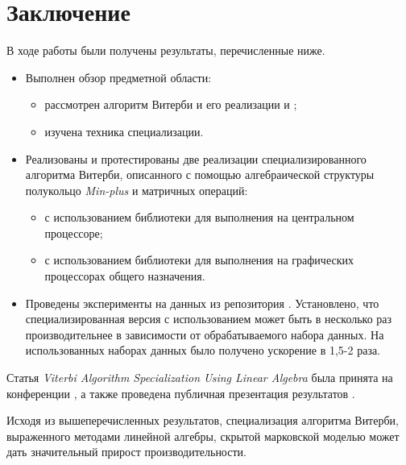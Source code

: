 \section{Заключение}
В ходе работы были получены результаты, перечисленные ниже.
\begin{itemize}
	\item Выполнен обзор предметной области:
		\begin{itemize}
			\item рассмотрен алгоритм Витерби и его реализации  и ;
			\item изучена техника специализации.
		\end{itemize}
	\item Реализованы и протестированы две реализации специализированного алгоритма Витерби, описанного с помощью алгебраической структуры полукольцо \emph{Min-plus} и матричных операций:
		\begin{itemize}
			\item с использованием библиотеки  для выполнения на центральном процессоре;
			\item с использованием библиотеки  для выполнения на графических процессорах общего назначения.
		\end{itemize}
	\item Проведены эксперименты на данных из репозитория . 
Установлено, что специализированная версия с использованием 
 может быть
в несколько раз производительнее  в зависимости от обрабатываемого набора данных.
На использованных наборах данных было получено ускорение в 1,5-2 раза.
\end{itemize}

Статья \emph{Viterbi Algorithm Specialization Using Linear 
Algebra} была принята на конференции , а 
также проведена публичная презентация результатов .

Исходя из вышеперечисленных результатов, специализация 
алгоритма Витерби, выраженного методами линейной алгебры, 
скрытой марковской моделью может дать значительный прирост 
производительности.
